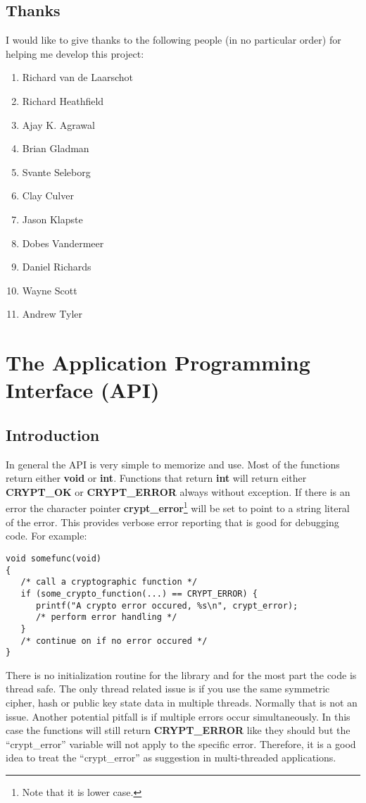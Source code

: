 \documentclass{book}
\begin{document}
\section{Thanks}
I would like to give thanks to the following people (in no particular order) for helping me develop this project:
\begin{enumerate}
   \item Richard van de Laarschot
   \item Richard Heathfield
   \item Ajay K. Agrawal
   \item Brian Gladman
   \item Svante Seleborg
   \item Clay Culver
   \item Jason Klapste
   \item Dobes Vandermeer
   \item Daniel Richards
   \item Wayne Scott
   \item Andrew Tyler
\end{enumerate}

\chapter{The Application Programming Interface (API)}
\section{Introduction}
 

In general the API is very simple to memorize and use.  Most of the functions return either {\bf void} or {\bf int}.  Functions
that return {\bf int} will return either {\bf CRYPT\_OK} or {\bf CRYPT\_ERROR} always without exception.  If there is an
error the character pointer {\bf crypt\_error}\footnote{Note that it is lower case.} will be set to point to a string
literal of the error.  This provides verbose error reporting that is good for debugging code.  For example:
\begin{verbatim}
void somefunc(void)
{
   /* call a cryptographic function */
   if (some_crypto_function(...) == CRYPT_ERROR) {
      printf("A crypto error occured, %s\n", crypt_error);
      /* perform error handling */
   }
   /* continue on if no error occured */
}
\end{verbatim}

There is no initialization routine for the library and for the most part the code is thread safe.  The only thread
related issue is if you use the same symmetric cipher, hash or public key state data in multiple threads.  Normally
that is not an issue.  Another potential pitfall is if multiple errors occur
simultaneously.  In this case the functions will still return {\bf CRYPT\_ERROR} like they should but the ``crypt\_error''
variable will not apply to the specific error.  Therefore, it is a good idea to treat the ``crypt\_error'' as suggestion
in multi-threaded applications.
\end{document}
